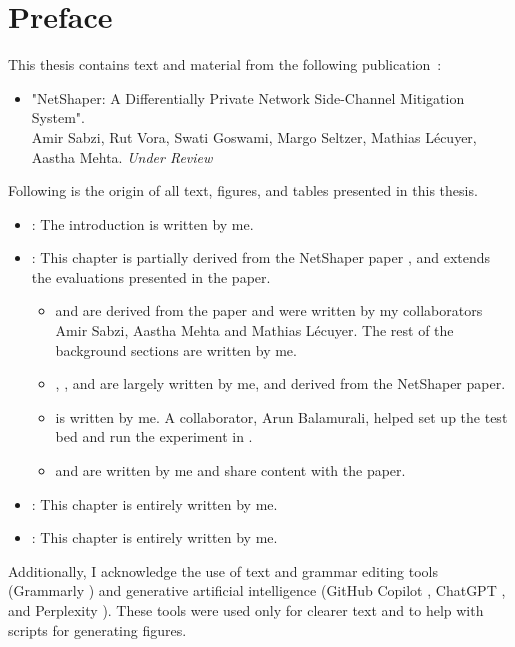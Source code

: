 
\chapter{Preface}


This thesis contains text and material from the following publication~\cite{sabzi2024netshaper}:
\begin{itemize}
  \item "NetShaper: A Differentially Private Network Side-Channel Mitigation System".
  \\
  Amir Sabzi, Rut Vora, Swati Goswami, Margo Seltzer, Mathias Lécuyer, Aastha Mehta. \textit{Under Review}
\end{itemize}

Following is the origin of all text, figures, and tables presented in this thesis.

\begin{itemize}
  \item \textbf{}: The introduction is written by me. 
  
  \item \textbf{}: This chapter is partially derived from the NetShaper paper \cite{sabzi2024netshaper}, and extends the evaluations presented in the paper.
  \begin{itemize}
      \item {} and  are derived from the paper and were written by my collaborators Amir Sabzi, Aastha Mehta and Mathias L\'{e}cuyer. The rest of the background sections are written by me.
      \item {}, , and  are largely written by me, and derived from the NetShaper paper.
      \item {} is written by me. A collaborator, Arun Balamurali, helped set up the test bed and run the experiment in .
      \item {} and  are written by me and share content with the paper.
  \end{itemize}
  
  \item \textbf{}: This chapter is entirely written by me.
  
  \item \textbf{}: This chapter is entirely written by me.

\end{itemize}


Additionally, I acknowledge the use of text and grammar editing tools (Grammarly \cite{grammarly}) and generative artificial intelligence (GitHub Copilot \cite{github_copilot}, ChatGPT \cite{chatgpt}, and Perplexity \cite{perplexity}). 
These tools were used only for clearer text and to help with scripts for generating figures.